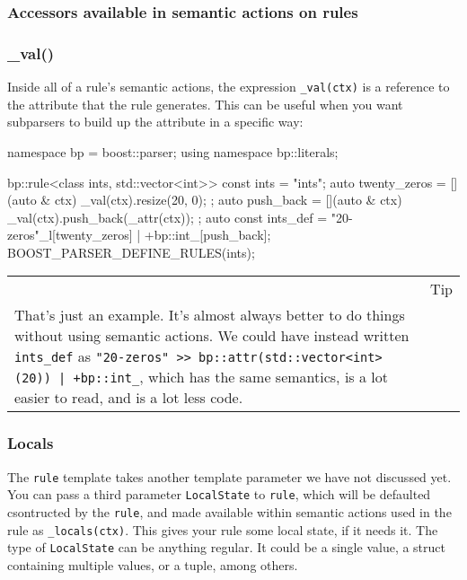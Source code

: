 \subsubsection{Accessors available in semantic actions on rules}

\subsubsection{\_val()}

Inside all of a rule's semantic actions, the expression \texttt{\_val(ctx)} is a reference to the attribute that the rule generates. This can be useful when you want subparsers to build up the attribute in a specific way:

\begin{code}
namespace bp = boost::parser;
using namespace bp::literals;

bp::rule<class ints, std::vector<int>> const ints = "ints";
auto twenty_zeros = [](auto & ctx) { _val(ctx).resize(20, 0); };
auto push_back = [](auto & ctx) { _val(ctx).push_back(_attr(ctx)); };
auto const ints_def = "20-zeros"_l[twenty_zeros] | +bp::int_[push_back];
BOOST_PARSER_DEFINE_RULES(ints);
\end{code}

\begin{longtable}[]{@{}
  >{\raggedright\arraybackslash}p{}
  >{\raggedright\arraybackslash}p{}@{}}
\toprule\noalign{}
\endhead
\bottomrule\noalign{}
\endlastfoot
\begin{minipage}[t]{\linewidth}\raggedright
\end{minipage} & Tip \\
That's just an example. It's almost always better to do things without using semantic actions. We could have instead written \texttt{ints\_def} as \texttt{"20-zeros" >> bp::attr(std::vector<int>(20)) | +bp::int\_}, which has the same semantics, is a lot easier to read, and is a lot less code. & \\
\end{longtable}

\subsubsection{Locals}

The \texttt{rule} template takes another template parameter we have not discussed yet. You can pass a third parameter \texttt{LocalState} to \texttt{rule}, which will be defaulted csontructed by the \texttt{rule}, and made available within semantic actions used in the rule as \texttt{\_locals(ctx)}. This gives your rule some local state, if it needs it. The type of \texttt{LocalState} can be anything regular. It could be a single value, a struct containing multiple values, or a tuple, among others.

